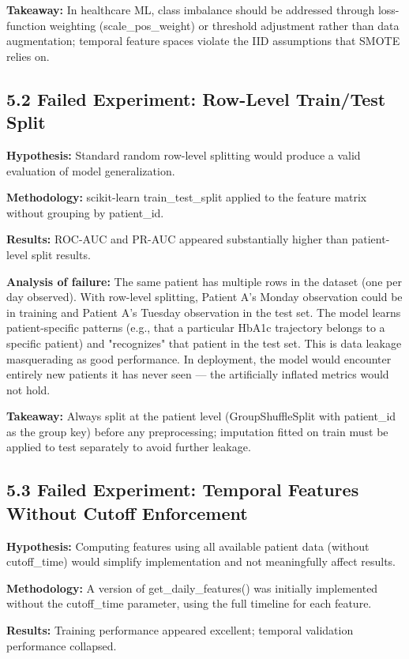 \documentclass[11pt,a4paper]{article}
\begin{document}
\textbf{Takeaway:} In healthcare ML, class imbalance should be addressed through loss-function weighting (scale\_pos\_weight) or threshold adjustment rather than data augmentation; temporal feature spaces violate the IID assumptions that SMOTE relies on.

\subsection{5.2 Failed Experiment: Row-Level Train/Test Split}

\textbf{Hypothesis:} Standard random row-level splitting would produce a valid evaluation of model generalization.

\textbf{Methodology:} scikit-learn train\_test\_split applied to the feature matrix without grouping by patient\_id.

\textbf{Results:} ROC-AUC and PR-AUC appeared substantially higher than patient-level split results.

\textbf{Analysis of failure:} The same patient has multiple rows in the dataset (one per day observed). With row-level splitting, Patient A's Monday observation could be in training and Patient A's Tuesday observation in the test set. The model learns patient-specific patterns (e.g., that a particular HbA1c trajectory belongs to a specific patient) and "recognizes" that patient in the test set. This is data leakage masquerading as good performance. In deployment, the model would encounter entirely new patients it has never seen --- the artificially inflated metrics would not hold.

\textbf{Takeaway:} Always split at the patient level (GroupShuffleSplit with patient\_id as the group key) before any preprocessing; imputation fitted on train must be applied to test separately to avoid further leakage.

\subsection{5.3 Failed Experiment: Temporal Features Without Cutoff Enforcement}

\textbf{Hypothesis:} Computing features using all available patient data (without cutoff\_time) would simplify implementation and not meaningfully affect results.

\textbf{Methodology:} A version of get\_daily\_features() was initially implemented without the cutoff\_time parameter, using the full timeline for each feature.

\textbf{Results:} Training performance appeared excellent; temporal validation performance collapsed.
\end{document}
